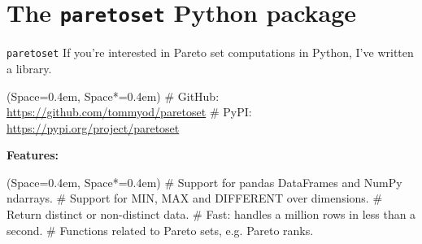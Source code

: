 \documentclass[11pt, aspectratio=149]{beamer}
\newcommand{\listSpace}{0.4em}
\theoremstyle{plain}
\begin{document}
\section{The \texttt{paretoset} Python package}
\begin{frame}[fragile, t]{\texttt{paretoset}}
	If you're interested in Pareto set computations in Python, I've written a library.
	\vspace{1em}
	\begin{easylist}[itemize]
		\ListProperties(Space=\listSpace, Space*=\listSpace)
		# GitHub: \url{https://github.com/tommyod/paretoset}
		# PyPI: \url{https://pypi.org/project/paretoset}
	\end{easylist}
	\vfill
	
	\textbf{Features:}
	\vspace{1em}
	\begin{easylist}[itemize]
		\ListProperties(Space=\listSpace, Space*=\listSpace)
		# Support for pandas DataFrames and NumPy ndarrays.
		# Support for MIN, MAX and DIFFERENT over dimensions.
		# Return distinct or non-distinct data.
		# Fast: handles a million rows in less than a second.
		# Functions related to Pareto sets, e.g. Pareto ranks.
	\end{easylist}
	\vfill
\end{frame}


\end{document}
